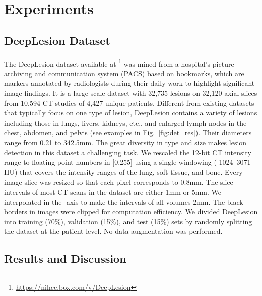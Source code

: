 \documentclass[a4paper]{llncs}
\def\Fig#1{{Fig.\ \ref{fig:#1}}}
\begin{document}
\section{Experiments}
\label{sec:detail}

\subsection{DeepLesion Dataset}
\label{subsec:ds}

The DeepLesion dataset \cite{Yan2018DeepLes} available at \footnote{\url{https://nihcc.box.com/v/DeepLesion}} was mined from a hospital's picture archiving and communication system (PACS) based on bookmarks, which are markers annotated by radiologists during their daily work to highlight significant image findings. It is a large-scale dataset with 32,735 lesions on 32,120 axial slices from 10,594 CT studies of 4,427 unique patients. Different from existing datasets that typically focus on one type of lesion, DeepLesion contains a variety of lesions including those in lungs, livers, kidneys, etc., and enlarged lymph nodes in the chest, abdomen, and pelvis (see examples in \Fig{det_res}). Their diameters range from 0.21 to 342.5mm. The great diversity in type and size makes lesion detection in this dataset a challenging task. We rescaled the 12-bit CT intensity range to floating-point numbers in [0,255] using a single windowing (-1024--3071 HU) that covers the intensity ranges of the lung, soft tissue, and bone. Every image slice was resized so that each pixel corresponds to 0.8mm. The slice intervals of most CT scans in the dataset are either 1mm or 5mm. We interpolated in the -axis to make the intervals of all volumes 2mm. The black borders in images were clipped for computation efficiency. We divided DeepLesion into training (70\%), validation (15\%), and test (15\%) sets by randomly splitting the dataset at the patient level. No data augmentation was performed.

\subsection{Results and Discussion}
\label{subsec:res}
\end{document}
